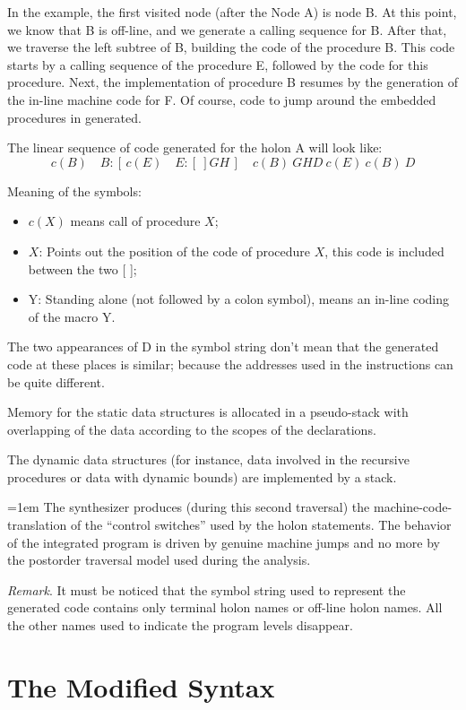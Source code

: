 \documentclass[openany,nobib]{tufte-book}
\begin{document}
In the example, the first visited node (after the Node A) is node B. At this
point, we know that B is off-line, and we generate a calling sequence for B.
After that, we traverse the left subtree of B, building the code of the
procedure B. This code starts by a calling sequence of the procedure E,
followed by the code for this procedure. Next, the implementation of procedure
B resumes by the generation of the in-line machine code for F. Of course, code
to jump around the embedded procedures in generated.

The linear sequence of code generated for the holon A will look like:
$$c(B)\quad B:[\,c(E) \quad E: [\ ] GH\,]\quad c(B)\ GHD\ c(E)\ c(B)\ D$$

Meaning of the symbols:
\begin{itemize}
    \item[] $c(X)$ means call of procedure $X$;
    \item[] $X$: Points out the position of the code of procedure $X$, this
code is included between the two [ ];
    \item[] Y: Standing alone (not followed by a colon symbol), means an
in-line coding of the macro Y.
\end{itemize}
The two appearances of D in the symbol string don't mean that the generated
code at these places is similar; because the addresses used in the instructions
can be quite different.

Memory for the static data structures is allocated in a pseudo-stack with
overlapping of the data according to the scopes of the declarations.

The dynamic data structures (for instance, data involved in the recursive
procedures or data with dynamic bounds) are implemented by a stack.

{\emergencystretch=1em The synthesizer produces (during this second traversal)
the
machine-code-translation of the ``control switches'' used by the holon
statements. The behavior of the integrated program is driven by genuine machine
jumps and no more by the postorder traversal model used during the
analysis.\par}

\bigskip\noindent
{\sl Remark}. It must be noticed that the symbol string used to represent the
generated code contains only terminal holon names or off-line holon names. All
the other names used to indicate the program levels disappear.

\chapter{The Modified Syntax}
\end{document}
